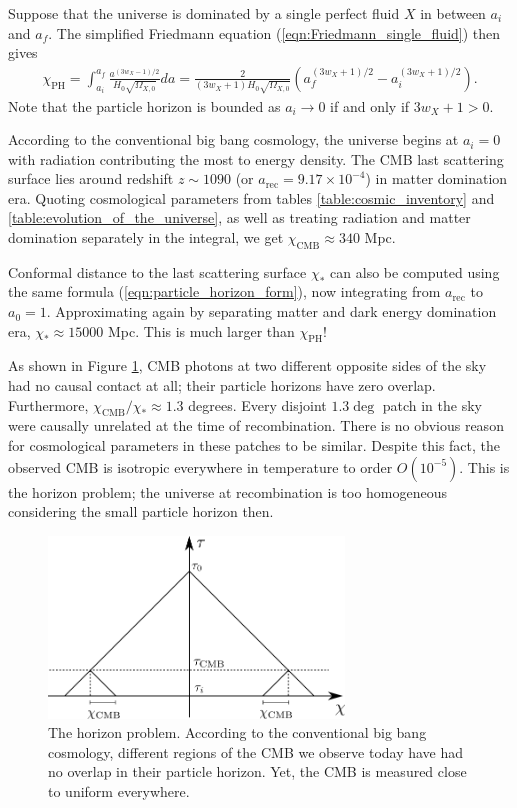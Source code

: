 Suppose that the universe is dominated by a single perfect fluid $X$ in between $a_i$ and $a_f$. The simplified Friedmann equation (\ref{eqn:Friedmann_single_fluid}) then gives
\begin{align}
	\chi_\text{PH} = \int_{a_i}^{a_f} \frac{a^{(3w_X - 1)/2}}{H_0 \sqrt{\Omega_{X,0}}} da = \frac{2}{(3w_X+1) H_0 \sqrt{\Omega_{X,0}}} \left( a_f^{(3w_X+1)/2} - a_i^{(3w_X+1)/2} \right). \label{eqn:particle_horizon_form}
\end{align}
Note that the particle horizon is bounded as $a_i \rightarrow 0$ if and only if $3w_X+1>0$.

According to the conventional big bang cosmology, the universe begins at $a_i=0$ with radiation contributing the most to energy density. The CMB last scattering surface lies around redshift $z \sim 1090$ (or $a_\text{rec}=9.17\times 10^{-4}$) in matter domination era. Quoting cosmological parameters from tables \ref{table:cosmic_inventory} and \ref{table:evolution_of_the_universe}, as well as treating radiation and matter domination separately in the integral, we get $\chi_\text{CMB} \approx 340$ Mpc.

Conformal distance to the last scattering surface $\chi_*$ can also be computed using the same formula (\ref{eqn:particle_horizon_form}), now integrating from $a_\text{rec}$ to $a_0=1$. Approximating again by separating matter and dark energy domination era, $\chi_* \approx 15000$ Mpc. This is much larger than $\chi_\text{PH}$!

As shown in Figure \ref{fig:horizon_problem}, CMB photons at two different opposite sides of the sky had no causal contact at all; their particle horizons have zero overlap. Furthermore, $\chi_\text{CMB}/\chi_* \approx 1.3$ degrees. Every disjoint $1.3\deg$ patch in the sky were causally unrelated at the time of recombination. There is no obvious reason for cosmological parameters in these patches to be similar. Despite this fact, the observed CMB is isotropic everywhere in temperature to order $O(10^{-5})$. This is the horizon problem; the universe at recombination is too homogeneous considering the small particle horizon then.
\begin{figure}[htbp!] 
	\centering    
	\includegraphics[width=0.7\textwidth]{horizon_problem.png}
	\caption[Horizon problem]{The horizon problem. According to the conventional big bang cosmology, different regions of the CMB we observe today have had no overlap in their particle horizon. Yet, the CMB is measured close to uniform everywhere.}
	\label{fig:horizon_problem}
\end{figure}

